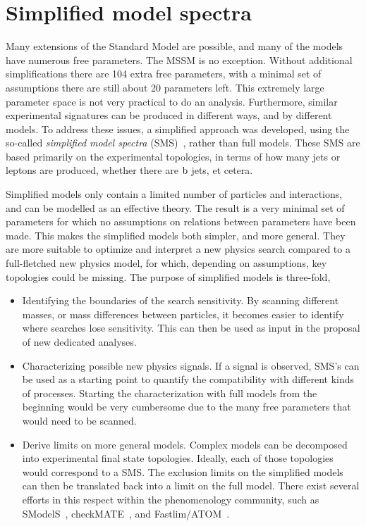 
\section{Simplified model spectra \label{sec:susy_sms}}

Many extensions of the Standard Model are possible, and many of the models have numerous free
parameters. The MSSM is no exception. Without additional simplifications there are 104 extra free
parameters, with a minimal set of assumptions there are still about 20 parameters left. This
extremely large parameter space is not very practical to do an analysis. 
Furthermore, similar experimental signatures can be produced in different ways, and by different
models.
To address these issues, a simplified approach was developed, using the so-called
\textit{simplified model spectra} (SMS)~\cite{Alves:2011wf,Alwall:2008ag,Chatrchyan:2013sza},
rather than full models. These SMS are based primarily on the experimental topologies, in terms of
how many jets or leptons are produced, whether there are $\mathrm{b}$ jets, et cetera. 

Simplified models only contain a limited number of particles and interactions, and can be modelled
as an effective theory. 
The result is a very minimal set of parameters for which no assumptions on relations between
parameters have been made. This makes the simplified models both simpler, and more general.
They are more suitable to optimize and interpret a new physics search compared to a full-fletched
new physics model, for which, depending on assumptions, key topologies could be missing.
The purpose of simplified models is three-fold,
\begin{itemize}
  \item Identifying the boundaries of the search sensitivity. By scanning different masses, or mass
differences between particles, it becomes easier to identify where searches lose sensitivity. This
can then be used as input in the proposal of new dedicated analyses. 

  \item Characterizing possible new physics signals. If a signal is observed, SMS's can be used as
a starting point to quantify the compatibility with different kinds of processes. Starting the
characterization with full models from the beginning would be very cumbersome due to the many free
parameters that would need to be scanned.

\item Derive limits on more general models. Complex models can be decomposed into experimental
final state topologies. Ideally, each of those topologies would correspond to a SMS. The exclusion
limits on the simplified models can then be translated back into a limit on the full model. There
exist several efforts in this respect within the phenomenology community, such as
SModelS~\cite{Kraml:2013mwa,Kraml:2014sna}, checkMATE~\cite{Kim:2015wza}, and
Fastlim/ATOM~\cite{Papucci:2014rja}.
\end{itemize}


